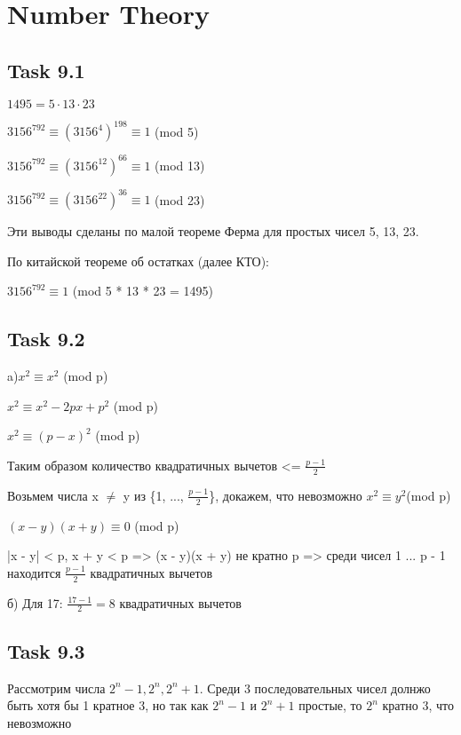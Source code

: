 \documentclass{article}
\begin{document}
    \section*{\Huge Number Theory}

        \subsection*{\huge Task 9.1}
        {\Large
            $1495 = 5\cdot13\cdot23$
            \par $3156^{792} \equiv (3156^{4})^{198} \equiv 1$ (mod 5)
            \par $3156^{792} \equiv (3156^{12})^{66} \equiv 1$ (mod 13)
            \par $3156^{792} \equiv (3156^{22})^{36} \equiv 1$ (mod 23) \par
            Эти выводы сделаны по малой теореме Ферма для простых чисел 5, 13, 23. \par
            По китайской теореме об остатках (далее КТО): \par
            $3156^{792} \equiv 1$ (mod 5 * 13 * 23 = 1495)
        }

        \subsection*{\huge Task 9.2}
        {\Large
            a)$x^2 \equiv x^2$ (mod p)\par
            $x^2 \equiv x^2 - 2px + p^2$ (mod p)\par
            $x^2 \equiv (p - x)^2$ (mod p)\par
            Таким образом количество квадратичных вычетов <= $\frac{p-1}{2}$\par
            Возьмем числа x $\neq$ y из \{1, ..., $\frac{p-1}{2}$\}, докажем, что невозможно $x^2 \equiv y^2$(mod p)\par
            $(x - y)(x + y) \equiv 0$ (mod p)\par
            |x - y| < p, x + y < p => (x - y)(x + y) не кратно p => среди чисел 1 ... p - 1 находится $\frac{p-1}{2}$ квадратичных вычетов\par
            б) Для 17: $\frac{17 - 1}{ 2} = 8$ квадратичных вычетов
        }

        \subsection*{\huge Task 9.3}
        {\Large
            Рассмотрим числа $2^n - 1, 2^n, 2^n+1$. Среди 3 последовательных чисел долнжо быть хотя бы 1 кратное 3, но так как $2^n - 1$ и $2^n + 1$ простые, то $2^n$ кратно 3, что невозможно
        }
\end{document}
